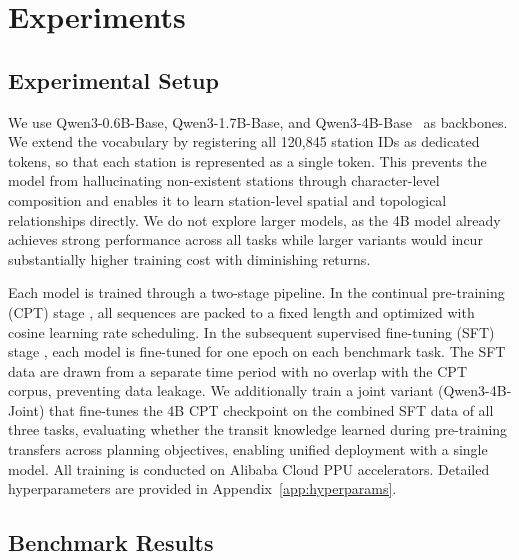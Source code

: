 \documentclass{llmxive}
\begin{document}
\section{Experiments}
\label{sec:experiments}

\subsection{Experimental Setup}
\label{sec:setup}

We use Qwen3-0.6B-Base, Qwen3-1.7B-Base, and Qwen3-4B-Base~\cite{yang2025qwen3} as backbones. We extend the vocabulary by registering all 120,845 station IDs as dedicated tokens, so that each station is represented as a single token. This prevents the model from hallucinating non-existent stations through character-level composition and enables it to learn station-level spatial and topological relationships directly. We do not explore larger models, as the 4B model already achieves strong performance across all tasks while larger variants would incur substantially higher training cost with diminishing returns.

Each model is trained through a two-stage pipeline. In the continual pre-training (CPT) stage \cite{gururangan2020dont}, all sequences are packed to a fixed length and optimized with cosine learning rate scheduling. In the subsequent supervised fine-tuning (SFT) stage \cite{ouyang2022training,wei2022finetuned}, each model is fine-tuned for one epoch on each benchmark task. The SFT data are drawn from a separate time period with no overlap with the CPT corpus, preventing data leakage. We additionally train a joint variant (Qwen3-4B-Joint) that fine-tunes the 4B CPT checkpoint on the combined SFT data of all three tasks, evaluating whether the transit knowledge learned during pre-training transfers across planning objectives, enabling unified deployment with a single model. All training is conducted on Alibaba Cloud PPU accelerators. Detailed hyperparameters are provided in Appendix~\ref{app:hyperparams}.

\subsection{Benchmark Results}
\label{sec:results}
\begingroup
\end{document}
